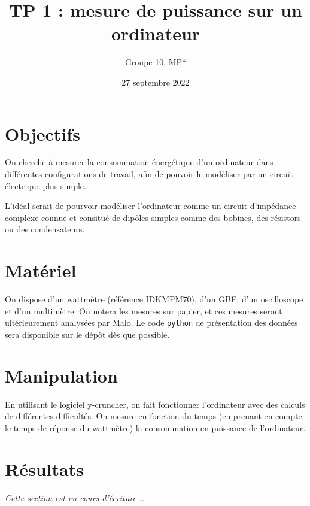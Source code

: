 \documentclass[french]{article}
\title{TP 1 : mesure de puissance sur un ordinateur}
\author{Groupe 10, MP*}
\date{27 septembre 2022}
\begin{document}
\maketitle

\section{Objectifs}

On cherche à mesurer la consommation énergétique d'un ordinateur dans différentes configurations de travail, afin de pouvoir le modéliser par un circuit électrique plus simple.

L'idéal serait de pourvoir modéliser l'ordinateur comme un circuit d'impé\-dance complexe connue et consitué de dipôles simples comme des bobines, des résistors ou des condensateurs.

\section{Matériel}

On dispose d'un wattmètre (référence IDKMPM70), d'un GBF, d'un oscilloscope et d'un multimètre.
On notera les mesures sur papier, et ces mesures seront ultérieurement analysées par Malo. Le code \texttt{python} de présentation des données sera disponible sur le dépôt dès que possible.

\section{Manipulation}

En utilisant le logiciel y-cruncher, on fait fonctionner l'ordinateur avec des calculs de différentes difficultés. On mesure en fonction du temps (en prenant en compte le temps de réponse du wattmètre) la consommation en puissance de l'ordinateur.

\section{Résultats}

\textit{Cette section est en cours d'écriture...}
\end{document}
